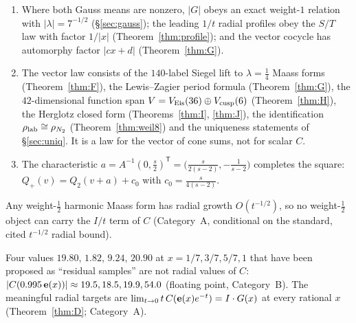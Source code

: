 \begin{proposition}\label{prop:weight8}
\begin{enumerate}[label=(\roman*)]
\item Where both Gauss means are nonzero, $|G|$ obeys an exact weight-$1$ relation with $|\lambda|=7^{-1/2}$ (\S\ref{sec:gauss}); the leading $1/t$ radial profiles obey
the $S/T$ law with factor $1/|x|$ (Theorem~\ref{thm:profile}); and the vector cocycle has automorphy factor $|cx+d|$ (Theorem~\ref{thm:G}).
\item The vector law consists of the $140$-label Siegel lift to $\lambda=\tfrac14$ Maass forms (Theorem~\ref{thm:F}), the Lewis--Zagier period formula
(Theorem~\ref{thm:G}), the $42$-dimensional function span $V=V_{\rm Eis}(36)\oplus V_{\rm cusp}(6)$ (Theorem~\ref{thm:H}), the Herglotz closed form
(Theorems~\ref{thm:I}, \ref{thm:J}), the identification $\rho_{\rm lab}\cong\rho_{N_2}$ (Theorem~\ref{thm:weil8}) and the uniqueness statements of \S\ref{sec:uniq}.
It is a law for the vector of cone sums, not for scalar $C$.
\item The characteristic $a=A^{-1}(0,\tfrac s2)^{\mathsf T}=\big(\tfrac s{2(s-2)},-\tfrac1{s-2}\big)$ completes the square: $Q_+(v)=Q_2(v+a)+c_0$ with $c_0=\tfrac s{4(s-2)}$.
\end{enumerate}
\end{proposition}

\begin{remark}\label{rem:holproj8}
Any weight-$\tfrac12$ harmonic Maass form has radial growth $O(t^{-1/2})$, so no weight-$\tfrac12$ object can carry the $I/t$ term of $C$ (Category~A, conditional on the
standard, cited $t^{-1/2}$ radial bound).
\end{remark}

\begin{remark}\label{rem:samples8}
Four values $19.80$, $1.82$, $9.24$, $20.90$ at $x=1/7,3/7,5/7,1$ that have been proposed as ``residual samples'' are not radial values of $C$:
$|C(0.995\,\mathbf{e}(x))|\approx19.5,18.5,19.9,54.0$ (floating point, Category~B). The meaningful radial targets are $\lim_{t\to0}t\,C(\mathbf{e}(x)e^{-t})=I\cdot G(x)$ at every
rational $x$ (Theorem~\ref{thm:D}; Category~A).
\end{remark}

